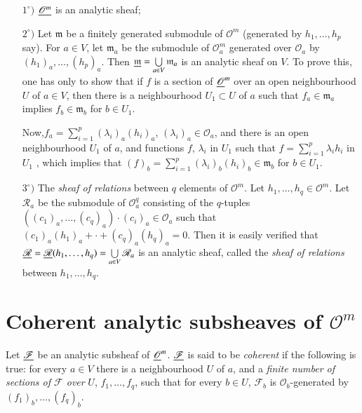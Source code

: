 \begin{examples*}
\begin{itemize}
\item[$1^\circ)$] $\underline{\mathscr{O}^m}$ is an analytic sheaf;

\item[$2^\circ)$] Let $\mathfrak{m}$ be a finitely generated submodule
  of $\mathscr{O}^m$ (generated by $h_1, \ldots, h_p$ say). For $a \in
  V$, let $\mathfrak{m}_a$ be the submodule of $\mathscr{O}^m_a$
  generated over $\mathscr{O}_a$ by $(h_1)_a, \ldots, (h_p)_a$. Then
  $\underline{\mathfrak{m}} = \bigcup\limits_{a \in V} \mathfrak{m}_a$ is an
  analytic sheaf on $V$. To prove this, one has only to show that if
  $f$ is a section of $\underline{\mathscr{O}}^m$ over an open neighbourhood
  $U$ of $a \in V$, then there is a neighbourhood $U_1 \subset U$ of
  $a$ such that $f_a \in \mathfrak{m}_a$ implies $f_b \in
  \mathfrak{m}_b$ for $b \in U_1$. 

Now,\pageoriginale $f_a = \sum\limits^p_{i=1} (\lambda_i)_a (h_i)_a$,
$(\lambda_i)_a \in\mathscr{O}_a$, and there is an open neighbourhood
$U_1$ of $a$, and functions $f$, $\lambda_i$ in $U_1$ such that $f =
\sum\limits^p_{i=1} \lambda_i h_i$ in $U_1$ , which implies that
$(f)_b = \sum\limits^p_{i=1} (\lambda_i)_b (h_i)_b \in \mathfrak{m}_b$
for $b \in U_1$. 

\item[$3^\circ)$] The \textit{sheaf of relations} between $q$ elements
  of $\mathscr{O}^m$. Let $h_1, \ldots, h_q \in \mathscr{O}^m$. Let
  $\mathscr{R}_a$  be the submodule of $\mathscr{O}^q_a$ consisting of
  the $q$-tuples $((c_1)_a, \ldots, (c_q)_a)\cdot (c_i)_a \in
  \mathscr{O}_a$ such that $(c_1)_a (h_1)_a + \cdot + (c_q)_a(h_q)_a =
  0$. Then it is easily verified that $\underline{\mathscr{R}} =
  \underline{\mathscr{R}} (h_1, \ldots, h_q) = \bigcup\limits_{a \in V}
  \mathscr{R}_a$  is an analytic sheaf, called the \textit{sheaf of
    relations} between $h_1, \ldots, h_q$.
\end{itemize}
\end{examples*}


\section{Coherent analytic subsheaves of \texorpdfstring{$\mathscr{O}^m$}{M0m}}\label{chap12:sec2}

\begin{defi*}
Let $\underline{\mathscr{F}}$ be an analytic subsheaf of
$\underline{\mathscr{O}}^m$. $\underline{\mathscr{F}}$ is said to be \textit{coherent}
if the following is true: for every $a \in V$ there is a neighbourhood
$U$ of $a$, and a \textit{finite number of sections of $\mathscr{F}$
  over} $U$, $f_1, \ldots, f_q$, such that for every $b \in U$,
$\mathscr{F}_b$ is $\mathscr{O}_b$-generated by $(f_1)_b, \ldots,
(f_q)_b$. 
\end{defi*}

